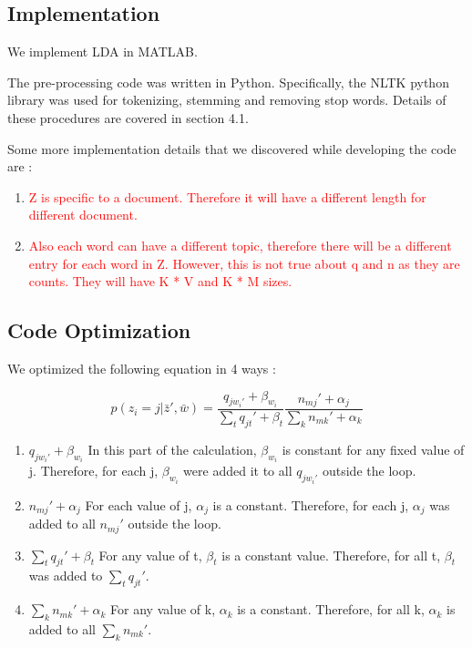 \documentclass[11pt,a4paper,oneside]{article}
\def\red{\textcolor{red}}
\begin{document}
\subsection{Implementation}
We implement LDA in \textsc{MATLAB}.

The pre-processing code was written in Python. Specifically, the NLTK python library was used for tokenizing, stemming and removing stop words. Details of these procedures are covered in section 4.1.

Some more implementation details that we discovered while developing the code are :

\begin{enumerate}
  \item \red{Z is specific to a document. Therefore it will have a different length for different document.}
  \item \red{Also each word can have a different topic, therefore there will be a different entry for each word in Z. However, this is not true about q and n as they are counts. They will have K * V and K * M sizes.}
\end{enumerate}

\subsection{Code Optimization}
We optimized the following equation in 4 ways :

\begin{equation}
p(z_i = j | \bar{z}', \bar{w}) = \frac{q_{j w_{i}'} + \beta_{w_i}}{\sum_t{q_{jt}' + \beta_t}}\frac{n_{mj}' + \alpha_j}{\sum_k{n_{mk}' + \alpha_k}}
\end{equation}

\begin{enumerate}
\item $q_{j w_{i}'}+\beta_{w_i}$ In this part of the calculation, $\beta_{w_i}$ is constant for any fixed value of j. Therefore, for each j, $\beta_{w_i}$ were added it to all $q_{j w_{i}'}$ outside the loop. 
\item $n_{mj}' + \alpha_j$ For each value of j, $\alpha_j$ is a constant. Therefore, for each j, $\alpha_j$ was added to all $n_{mj}'$ outside the loop.
\item $\sum_t{q_{jt}' + \beta_t}$ For any value of t, $\beta_t$ is a constant value. Therefore, for all t, $\beta_t$ was added to $\sum_t{q_{jt}}'$.
\item $\sum_k{n_{mk}' + \alpha_k}$ For any value of k, $\alpha_k$ is a constant. Therefore, for all k, $\alpha_k$ is added to all $\sum_k{n_{mk}}'$.
\end{enumerate}
\end{document}
